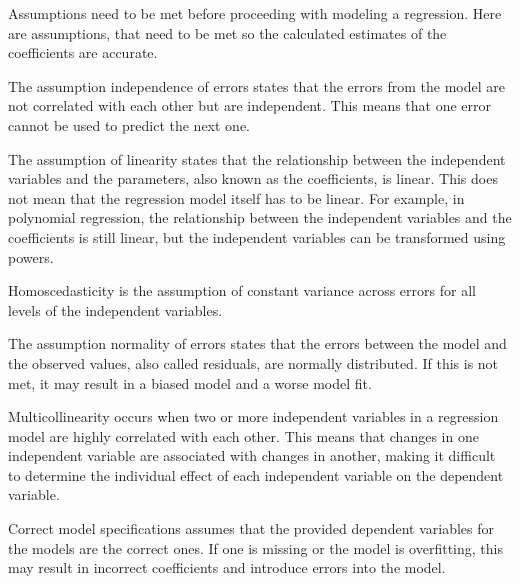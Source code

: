 Assumptions need to be met before proceeding with modeling a regression. Here are assumptions, that need to be met so the calculated estimates of the coefficients are accurate.
\newline 

The assumption independence of errors states that the errors from the model are not correlated with each other but are independent. This means that one error cannot be used to predict the next one. \newline


 The assumption of linearity states that the relationship between the independent variables and the parameters, also known as the coefficients, is linear. This does not mean that the regression model itself has to be linear. For example, in polynomial regression, the relationship between the independent variables and the coefficients is still linear, but the independent variables can be transformed using powers.\newline


Homoscedasticity is the assumption of constant variance across errors for all levels of the independent variables. \newline

The assumption normality of errors states that the errors between the model and the observed values, also called residuals, are normally distributed. If this is not met, it may result in a biased model and a worse model fit. \newline


Multicollinearity occurs when two or more independent variables in a regression model are highly correlated with each other. This means that changes in one independent variable are associated with changes in another, making it difficult to determine the individual effect of each independent variable on the dependent variable. \newline

Correct model specifications assumes that the provided dependent variables for the models are the correct ones. If one is missing or the model is overfitting, this may result in incorrect coefficients and introduce errors into the model.

